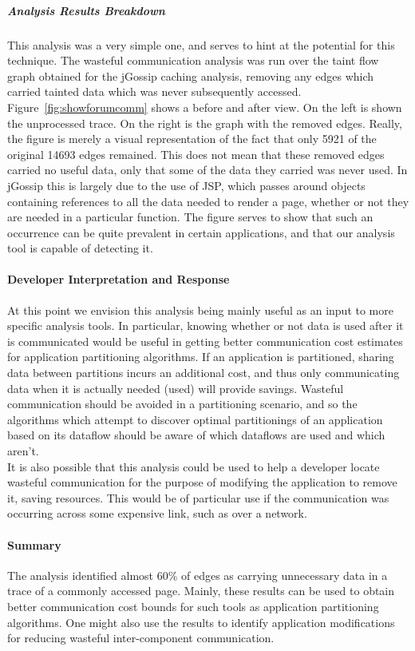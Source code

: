 \documentclass[msc,oneside]{ubcthesis}
\begin{document}
\subparagraph{Analysis Results Breakdown}
This analysis was a very simple one, and serves to hint at the potential for this technique. The wasteful communication analysis was run over the taint flow graph obtained for the jGossip caching analysis, removing any edges which carried tainted data which was never subsequently accessed. Figure~\ref{fig:showforumcomm} shows a before and after view. On the left is shown the unprocessed trace. On the right is the graph with the removed edges. Really, the figure is merely a visual representation of the fact that only 5921 of the original 14693 edges remained. This does not mean that these removed edges carried no useful data, only that some of the data they carried was never used. In jGossip this is largely due to the use of JSP, which passes around objects containing references to all the data needed to render a page, whether or not they are needed in a particular function. The figure serves to show that such an occurrence can be quite prevalent in certain applications, and that our analysis tool is capable of detecting it.

\paragraph{Developer Interpretation and Response}
At this point we envision this analysis being mainly useful as an input to more specific analysis tools. In particular, knowing whether or not data is used after it is communicated would be useful in getting better communication cost estimates for application partitioning algorithms. If an application is partitioned, sharing data between partitions incurs an additional cost, and thus only communicating data when it is actually needed (used) will provide savings. Wasteful communication should be avoided in a partitioning scenario, and so the algorithms which attempt to discover optimal partitionings of an application based on its dataflow should be aware of which dataflows are used and which aren't.\\

It is also possible that this analysis could be used to help a developer locate wasteful communication for the purpose of modifying the application to remove it, saving resources. This would be of particular use if the communication was occurring across some expensive link, such as over a network.

\paragraph{Summary}
The analysis identified almost 60\% of edges as carrying unnecessary data in a trace of a commonly accessed page. Mainly, these results can be used to obtain better communication cost bounds for such tools as application partitioning algorithms. One might also use the results to identify application modifications for reducing wasteful inter-component communication.
\end{document}
